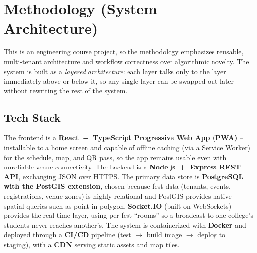 \documentclass[11pt,a4paper]{article}
\begin{document}
\section{Methodology (System Architecture)}

This is an engineering course project, so the methodology emphasizes reusable,
multi-tenant architecture and workflow correctness over algorithmic novelty. The system
is built as a \emph{layered architecture}: each layer talks only to the layer
immediately above or below it, so any single layer can be swapped out later without
rewriting the rest of the system.

\subsection{Tech Stack}
The frontend is a \textbf{React~+~TypeScript Progressive Web App (PWA)} -- installable
to a home screen and capable of offline caching (via a Service Worker) for the
schedule, map, and QR pass, so the app remains usable even with unreliable venue
connectivity. The backend is a \textbf{Node.js~+~Express REST API}, exchanging JSON
over HTTPS. The primary data store is \textbf{PostgreSQL with the PostGIS extension},
chosen because fest data (tenants, events, registrations, venue zones) is highly
relational and PostGIS provides native spatial queries such as point-in-polygon.
 \textbf{Socket.IO} (built on WebSockets)
provides the real-time layer, using per-fest ``rooms'' so a broadcast to one college's
students never reaches another's. The system is containerized with \textbf{Docker} and
deployed through a \textbf{CI/CD} pipeline (test $\rightarrow$ build image
$\rightarrow$ deploy to staging), with a \textbf{CDN} serving static assets and map
tiles.
\end{document}
